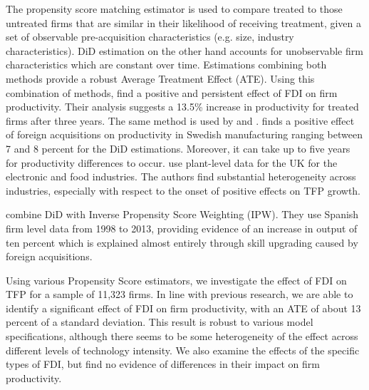 \documentclass[a4paper,11pt]{scrartcl}
\begin{document}
The propensity score matching estimator is used to compare treated to those untreated firms that are similar in their likelihood of receiving treatment, 
given a set of observable pre-acquisition characteristics (e.g. size, industry characteristics). %
 DiD estimation on the other hand accounts for unobservable firm characteristics which are constant over time. Estimations combining both methods provide a robust Average Treatment Effect (ATE). %
Using this combination of methods, \citet{arnold2009}  find a positive and persistent effect of FDI on firm productivity. Their analysis suggests a 13.5\% increase in productivity for treated firms after three years. The same method is used by \citet{karpaty2007, girma2007} and \citet{schiffbauer2017}. \citet{karpaty2007} finds a positive effect of foreign acquisitions on productivity in Swedish manufacturing ranging between 7 and 8 percent for the DiD estimations. Moreover, it can take up to five years for productivity differences to occur. \citet{girma2007} use plant-level data for the UK for the electronic and food industries. The authors %
find substantial heterogeneity across industries, especially with respect to the onset of positive effects on TFP growth. %

\citet{koch2019} combine DiD with Inverse Propensity Score Weighting (IPW). They use Spanish firm level data from 1998 to 2013, providing evidence of an increase in output of ten percent which is explained almost entirely
 through skill upgrading caused by foreign acquisitions.

Using various Propensity Score estimators, we investigate the effect of FDI on TFP for a sample of 11,323 firms. In line with previous research, we are able to identify a %
significant effect of FDI on firm productivity, with an ATE of about 13 percent of a standard deviation. This result is robust to various model specifications, although there seems to be some heterogeneity of the effect across different levels of technology intensity. We also examine the effects of the specific types of FDI, but find no evidence of differences in their impact on firm productivity.
\end{document}
